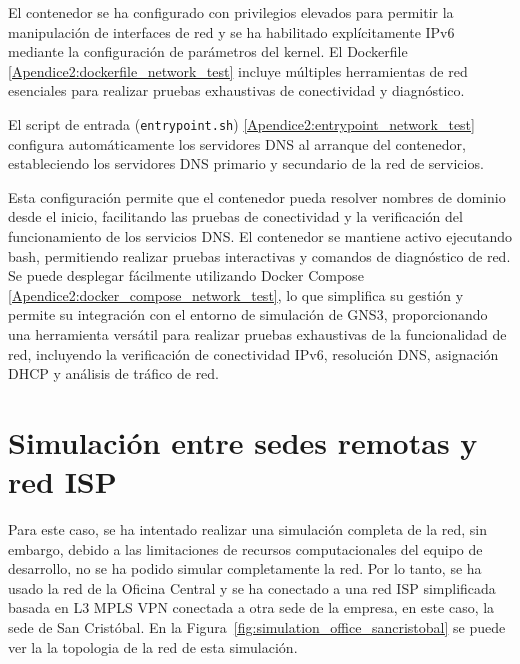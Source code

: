 \vspace{0.5cm}
El contenedor se ha configurado con privilegios elevados para permitir la manipulación de interfaces de red y se ha habilitado explícitamente IPv6 mediante la configuración de parámetros del kernel. El Dockerfile \ref{Apendice2:dockerfile_network_test} incluye múltiples herramientas de red esenciales para realizar pruebas exhaustivas de conectividad y diagnóstico.

\vspace{0.5cm}
El script de entrada (\texttt{entrypoint.sh}) \ref{Apendice2:entrypoint_network_test} configura automáticamente los servidores DNS al arranque del contenedor, estableciendo los servidores DNS primario y secundario de la red de servicios.

\vspace{0.5cm}
Esta configuración permite que el contenedor pueda resolver nombres de dominio desde el inicio, facilitando las pruebas de conectividad y la verificación del funcionamiento de los servicios DNS. El contenedor se mantiene activo ejecutando bash, permitiendo realizar pruebas interactivas y comandos de diagnóstico de red. Se puede desplegar fácilmente utilizando Docker Compose \ref{Apendice2:docker_compose_network_test}, lo que simplifica su gestión y permite su integración con el entorno de simulación de GNS3, proporcionando una herramienta versátil para realizar pruebas exhaustivas de la funcionalidad de red, incluyendo la verificación de conectividad IPv6, resolución DNS, asignación DHCP y análisis de tráfico de red.

\section{Simulación entre sedes remotas y red ISP}
\label{sec:simulacion_completa}
Para este caso, se ha intentado realizar una simulación completa de la red, sin embargo, debido a las limitaciones
de recursos computacionales del equipo de desarrollo, no se ha podido simular completamente la red. Por lo tanto, se ha
usado la red de la Oficina Central y se ha conectado a una red ISP simplificada basada en L3 MPLS VPN conectada a otra sede de la empresa, en este caso, la sede de San Cristóbal. En la Figura~\ref{fig:simulation_office_sancristobal} se puede ver la la topologia de la red de esta simulación.


